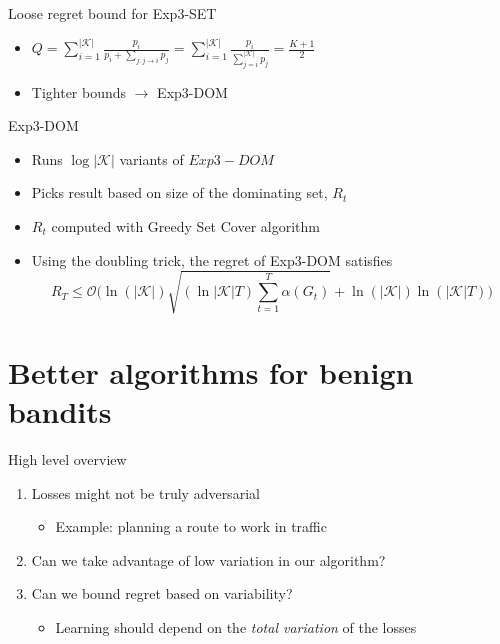 \documentclass{beamer}
\begin{document}
\begin{frame}{Loose regret bound for Exp3-SET}
\begin{itemize}
   \item $Q=\sum_{i=1}^{|\mathcal{K}|}\frac{p_i}{p_i+\sum_{j:j\to i}p_j}=\sum_{i=1}^{|\mathcal{K}|}\frac{p_i}{\sum_{j=i}^{|\mathcal{K}|}p_j}=\frac{K+1}{2}$

   \item Tighter bounds $\to$ Exp3-DOM
  \end{itemize}
\end{frame}

\begin{frame}{Exp3-DOM}
  \begin{itemize}
    \item Runs $\log |\mathcal{K}|$ variants of $Exp3-DOM$
    \item Picks result based on size of the dominating set, $R_t$
    \item $R_t$ computed with Greedy Set Cover algorithm 
    \item Using the doubling trick, the regret of Exp3-DOM satisfies 
      $$R_T\leq \mathcal{O}\Bigg(\ln(|\mathcal{K}|)\sqrt{(\ln |\mathcal{K}|T)\sum_{t=1}^T\alpha(G_t)}+\ln(|\mathcal{K}|)\ln (|\mathcal{K}|T)\Bigg)$$
  \end{itemize}
\end{frame}

\section{Better algorithms for benign bandits}
\begin{frame}{High level overview}

  \begin{enumerate}
  \item
    Losses might not be truly adversarial
    \begin{itemize}   
    \item
      Example: planning a route to work in traffic
    \end{itemize}
    \item
      Can we take advantage of low variation in our algorithm?
    \item
       Can we bound regret based on variability?
      \begin{itemize}
        \item
          Learning should depend on the \textit{total variation} of the losses
        \end{itemize}
  \end{enumerate}
\end{frame}
\end{document}
